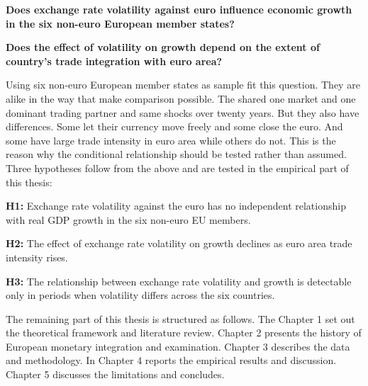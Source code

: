 \textbf{Does exchange rate volatility against euro influence economic growth in the six non-euro European member states?}

\vspace{\baselineskip}

\textbf{Does the effect of volatility on growth depend on the extent of country's trade integration with euro area?}

\vspace{\baselineskip}

Using six non-euro European member states as sample fit this question.
They are alike in the way that make comparison possible.
The shared one market and one dominant trading partner and same shocks over twenty years.
But they also have differences.
Some let their currency move freely and some close the euro.
And some have large trade intensity in euro area while others do not.
This is the reason why the conditional relationship should be tested rather than assumed.
Three hypotheses follow from the above and are tested in the empirical part of this thesis:

\vspace{\baselineskip}
\textbf{H1:} Exchange rate volatility against the euro has no independent relationship with
real GDP growth in the six non-euro EU members.

\vspace{\baselineskip}

\textbf{H2:} The effect of exchange rate volatility on growth declines as euro area trade intensity rises.
\vspace{\baselineskip}

\textbf{H3:} The relationship between exchange rate volatility and growth is detectable only
in periods when volatility differs across the six countries.

\vspace{\baselineskip}
The remaining part of this thesis is structured as follows.
The Chapter 1 set out the theoretical framework and literature review.
Chapter 2 presents the history of European monetary integration and examination.
Chapter 3 describes the data and methodology.
In Chapter 4 reports the empirical results and discussion.
Chapter 5 discusses the limitations and concludes.

